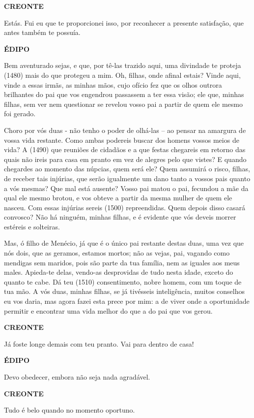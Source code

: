 \textbf{CREONTE }

Estás. Fui eu que te proporcionei isso, por reconhecer a presente
satisfação, que antes também te possuía.

\textbf{ÉDIPO}

Bem aventurado sejas, e que, por tê-las trazido aqui, uma divindade te
proteja (1480) mais do que protegeu a mim. Oh, filhas, onde afinal
estais? Vinde aqui, vinde a essas irmãs, as minhas mãos, cujo ofício fez
que os olhos outrora brilhantes do pai que vos engendrou passassem a ter
essa visão; ele que, minhas filhas, sem ver nem questionar se revelou
vosso pai a partir de quem ele mesmo foi gerado.

Choro por vós duas - não tenho o poder de olhá-las -- ao pensar na
amargura de vossa vida restante. Como ambas podereis buscar dos homens
vossos meios de vida? A (1490) que reuniões de cidadãos e a que festas
chegareis em retorno das quais não ireis para casa em pranto em vez de
alegres pelo que vistes? E quando chegardes ao momento das núpcias, quem
será ele? Quem assumirá o risco, filhas, de receber tais injúrias, que
serão igualmente um dano tanto a vossos pais quanto a vós mesmas? Que
mal está ausente? Vosso pai matou o pai, fecundou a mãe da qual ele
mesmo brotou, e vos obteve a partir da mesma mulher de quem ele nasceu.
Com essas injúrias sereis (1500) repreendidas. Quem depois disso casará
convosco? Não há ninguém, minhas filhas, e é evidente que vós deveis
morrer estéreis e solteiras.

Mas, ó filho de Menécio, já que é o único pai restante destas duas, uma
vez que nós dois, que as geramos, estamos mortos; não as vejas, pai,
vagando como mendigas sem maridos, pois são parte da tua família, nem as
iguales aos meus males. Apieda-te delas, vendo-as desprovidas de tudo
nesta idade, exceto do quanto te cabe. Dá teu (1510) consentimento,
nobre homem, com um toque de tua mão. A vós duas, minhas filhas, se já
tivésseis inteligência, muitos conselhos eu vos daria, mas agora fazei
esta prece por mim: a de viver onde a oportunidade permitir e encontrar
uma vida melhor do que a do pai que vos gerou.

\textbf{CREONTE }

Já foste longe demais com teu pranto. Vai para dentro de casa!

\textbf{ÉDIPO}

Devo obedecer, embora não seja nada agradável.

\textbf{CREONTE }

Tudo é belo quando no momento oportuno.

